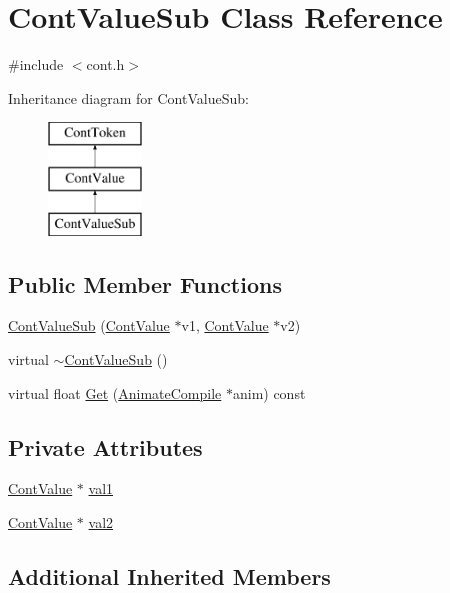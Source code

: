\hypertarget{a00094}{\section{Cont\-Value\-Sub Class Reference}
\label{a00094}
}


{\ttfamily \#include $<$cont.\-h$>$}

Inheritance diagram for Cont\-Value\-Sub\-:\begin{figure}[H]
\begin{center}
\leavevmode
\includegraphics[height=3.000000cm]{a00094}
\end{center}
\end{figure}
\subsection*{Public Member Functions}
\begin{DoxyCompactItemize}
\item 
\hyperlink{a00094_a7074b1d2fd1df9b891faa0c31bddcbdc}{Cont\-Value\-Sub} (\hyperlink{a00086}{Cont\-Value} $\ast$v1, \hyperlink{a00086}{Cont\-Value} $\ast$v2)
\item 
virtual \hyperlink{a00094_a5bac876f7883c48d3c2e62a0fc83126a}{$\sim$\-Cont\-Value\-Sub} ()
\item 
virtual float \hyperlink{a00094_a4a842eb6e8ed9110fd28e476473bc615}{Get} (\hyperlink{a00007}{Animate\-Compile} $\ast$anim) const 
\end{DoxyCompactItemize}
\subsection*{Private Attributes}
\begin{DoxyCompactItemize}
\item 
\hyperlink{a00086}{Cont\-Value} $\ast$ \hyperlink{a00094_aea7fcfb875bc2b48349c5623c827e462}{val1}
\item 
\hyperlink{a00086}{Cont\-Value} $\ast$ \hyperlink{a00094_a8fb20f6acd76c1cfcbda98871e80dc31}{val2}
\end{DoxyCompactItemize}
\subsection*{Additional Inherited Members}


